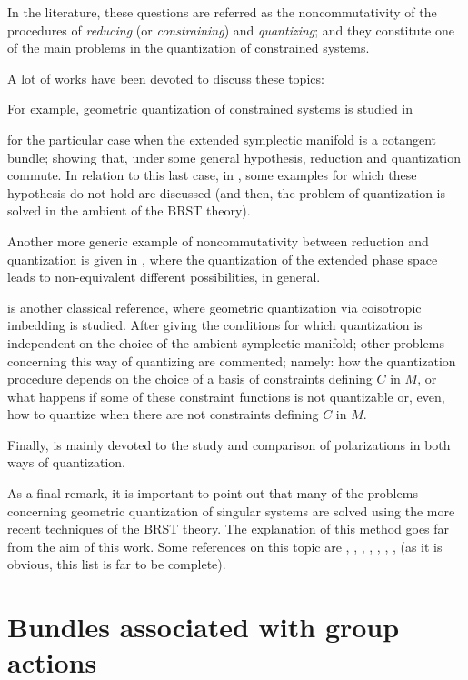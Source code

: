 \documentclass[12pt]{article}
\theoremstyle{plain}
\begin{document}
In the literature, these questions are referred as the
noncommutativity of the procedures of
{\it reducing} (or {\it constraining}) and {\it quantizing};
and they constitute one of the main problems in the quantization of
constrained systems.

A lot of works have been devoted to discuss these topics:

For example, geometric quantization of constrained systems is studied in

\cite{Go-86}
for the particular case when the extended symplectic manifold
is a cotangent bundle;
showing that, under some general hypothesis, reduction and quantization
commute.
In relation to this last case, in \cite{DET-90}, some examples for which
these
hypothesis do not hold are discussed (and then, the problem
of quantization is solved in the ambient of the BRST theory).

Another more generic example of noncommutativity between reduction and
quantization
is given in \cite{Lo-90}, where the quantization of the extended phase
space
leads to non-equivalent different possibilities, in general.

\cite{GS-81} is another classical reference, where geometric
quantization via
coisotropic imbedding is studied. After giving the conditions for which
quantization is independent on the choice of the ambient symplectic
manifold;
other problems concerning this way of quantizing are commented;
namely: how the quantization procedure depends on the choice of a basis
of constraints
defining $C$ in $M$, or what happens if some of these constraint
functions is not quantizable or, even, how to quantize when there are
not
constraints defining $C$ in $M$.

Finally, \cite{AS-86} is mainly devoted to the study and comparison of
polarizations in both ways of quantization.

As a final remark, it is important to point out that many of the
problems concerning geometric quantization of singular systems
are solved using the more recent techniques of the
BRST theory. The explanation of this method goes far from the aim
of this work. Some references on this topic are
\cite{ALN-90}, \cite{ALN-91}, \cite{DEGST-91}, \cite{Ib-90},
\cite{Ko-77}, \cite{Lo-92},
\cite{Tu-92a}, \cite{Tu-92b} (as it is obvious, this list is far to be
complete).




\appendix


\section{Bundles associated with group actions}
\end{document}
